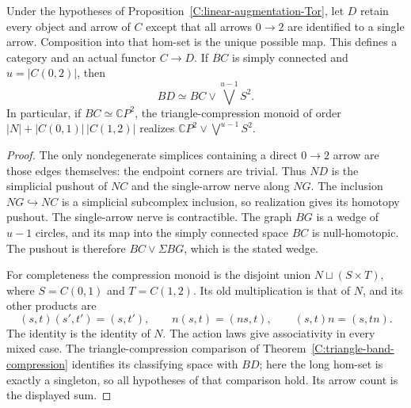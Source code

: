 \begin{proposition}
\label{C:linear-long-hom-collapse}
Under the hypotheses of
Proposition~\ref{C:linear-augmentation-Tor}, let $D$
retain every object and arrow of $C$ except that all
arrows $0\to2$ are identified to a single arrow.
Composition into that hom-set is the unique possible
map.  This defines a category and an actual functor
$C\to D$.  If $BC$ is simply connected and
$u=|C(0,2)|$, then
\[
 BD\simeq BC\vee\bigvee^{u-1}S^2.
\]
In particular, if $BC\simeq\mathbb CP^2$, the
triangle-compression monoid of order
$|N|+|C(0,1)|\,|C(1,2)|$ realizes
$\mathbb CP^2\vee\bigvee^{u-1}S^2$.
\end{proposition}
\begin{proof}
The only nondegenerate simplices containing a direct
$0\to2$ arrow are those edges themselves: the endpoint
corners are trivial.  Thus $ND$ is the simplicial pushout
of $NC$ and the single-arrow nerve along $NG$.
The inclusion $NG\hookrightarrow NC$ is a simplicial
subcomplex inclusion, so realization gives its homotopy
pushout.  The single-arrow nerve is contractible.
The graph $BG$ is a wedge of $u-1$ circles, and its
map into the simply connected space $BC$ is
null-homotopic.  The pushout is therefore
$BC\vee\Sigma BG$, which is the stated wedge.

For completeness the compression monoid is the disjoint
union $N\sqcup(S\times T)$, where
$S=C(0,1)$ and $T=C(1,2)$.  Its old multiplication is
that of $N$, and its other products are
\[
 (s,t)(s',t')=(s,t'),\qquad
 n(s,t)=(ns,t),\qquad (s,t)n=(s,tn).
\]
The identity is the identity of $N$.  The action laws
give associativity in every mixed case.  The triangle-compression comparison of
Theorem~\ref{C:triangle-band-compression} identifies its
classifying space with $BD$; here the long hom-set is
exactly a singleton, so all hypotheses of that comparison
hold.  Its arrow count is the displayed sum.
\end{proof}
